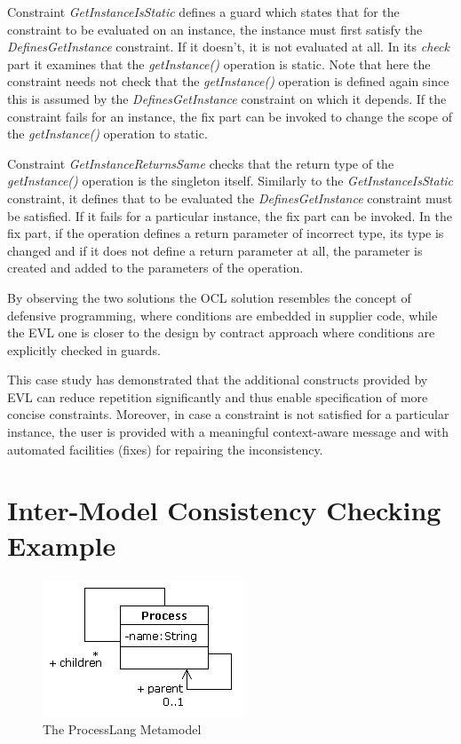 Constraint \emph{GetInstanceIsStatic} defines a guard which states that for the constraint to be evaluated on an instance, the instance must first satisfy the \emph{DefinesGetInstance} constraint. If it doesn't, it is not evaluated at all. In its \emph{check} part it examines that the \emph{getInstance()} operation is static. Note that here the constraint needs not check that the \emph{getInstance()} operation is defined again since this is assumed by the \emph{DefinesGetInstance} constraint on which it depends. If the constraint fails for an instance, the fix part can be invoked to change the scope of the \emph{getInstance()} operation to static.

Constraint \emph{GetInstanceReturnsSame} checks that the return type of the \emph{getInstance()} operation is the singleton itself. Similarly to the \emph{GetInstanceIsStatic} constraint, it defines that to be evaluated the \emph{DefinesGetInstance} constraint must be satisfied. If it fails for a particular instance, the fix part can be invoked. In the fix part, if the operation defines a return parameter of incorrect type, its type is changed and if it does not define a return parameter at all, the parameter is created and added to the parameters of the operation.

By observing the two solutions the OCL solution resembles the concept of defensive programming, where conditions are embedded in supplier code, while the EVL one is closer to the design by contract \cite{Meyer97} approach where conditions are explicitly checked in guards.

This case study has demonstrated that the additional constructs provided by EVL can reduce repetition significantly and thus enable specification of more concise constraints. Moreover, in case a constraint is not satisfied for a particular instance, the user is provided with a meaningful context-aware message and with automated facilities (fixes) for repairing the inconsistency.

\section{Inter-Model Consistency Checking Example}
\label{sec:EvlInterModelExample}

\begin{figure}[b]
	\centering
		\includegraphics{images/Process.png}
	\caption{The ProcessLang Metamodel}
	\label{fig:Process}
\end{figure}

